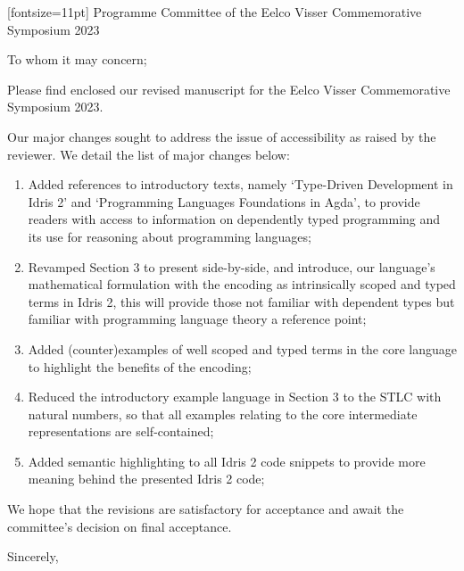 \documentclass[UKenglish,final,a4paper,oneside]{scrlttr2}
\begin{document}
\begin{letter}[fontsize=11pt]%
  {%
    Programme Committee of the Eelco Visser Commemorative Symposium 2023
  }

  \opening{To whom it may concern;}

  Please find enclosed our revised manuscript for the Eelco Visser Commemorative Symposium 2023.

  Our major changes sought to address the issue of accessibility as raised by the reviewer.
  We detail the list of major changes below:

  \begin{enumerate}
    \item Added references to introductory texts, namely `Type-Driven Development in Idris 2'
       and `Programming Languages Foundations in Agda', to provide readers with access to information on dependently typed programming and its use for reasoning about programming languages;
     \item Revamped Section 3 to present side-by-side, and introduce, our language's mathematical formulation with the encoding as intrinsically scoped and typed terms in Idris 2, this will provide those not familiar with dependent types but familiar with programming language theory a reference point;
     \item Added (counter)examples of well scoped and typed terms in the core language to highlight the benefits of the encoding;

     \item Reduced the introductory example language in Section 3 to the STLC with natural numbers, so that all examples relating to the core intermediate representations are self-contained;

    \item Added semantic highlighting to all Idris 2 code snippets to provide more meaning behind the presented Idris 2 code;
  \end{enumerate}

  We hope that the revisions are satisfactory for acceptance and await the committee's decision on final acceptance.

\closing{Sincerely,}
\end{letter}
\end{document}
